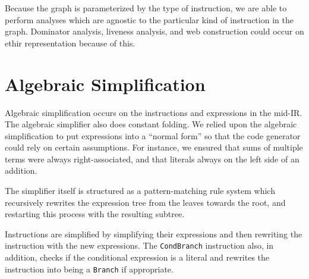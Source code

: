 \documentclass[11pt]{article}
\begin{document}
Because the graph is parameterized by the type of instruction, we are
able to perform analyses which are agnostic to the particular kind of
instruction in the graph.  Dominator analysis, liveness analysis, and
web construction could occur on ethir representation because of this.

\section {Algebraic Simplification} 

Algebraic simplification occurs on the instructions and expressions in
the mid-IR.  The algebraic simplifier also does constant folding.  We
relied upon the algebraic simplification to put expressions into a
``normal form'' so that the code generator could rely on certain
assumptions.  For instance, we ensured that sums of multiple terms
were always right-associated, and that literals always on the left
side of an addition.

The simplifier itself is structured as a pattern-matching rule system
which recursively rewrites the expression tree from the leaves towards
the root, and restarting this process with the resulting subtree.

Instructions are simplified by simplifying their expressions and then
rewriting the instruction with the new expressions.  The
\texttt{CondBranch} instruction also, in addition, checks if the
conditional expression is a literal and rewrites the instruction into
being a \texttt{Branch} if appropriate.
\end{document}
